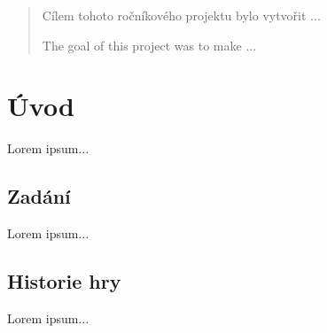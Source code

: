 \begin{abstract}
    Cílem tohoto ročníkového projektu bylo vytvořit ...
    
    \hspace{}
    
    \hspace{}
    
    The goal of this project was to make ...
    
\end{abstract}

\section{Úvod}

Lorem ipsum...

\subsection{Zadání}

Lorem ipsum...

\subsection{Historie hry}
Lorem ipsum...
